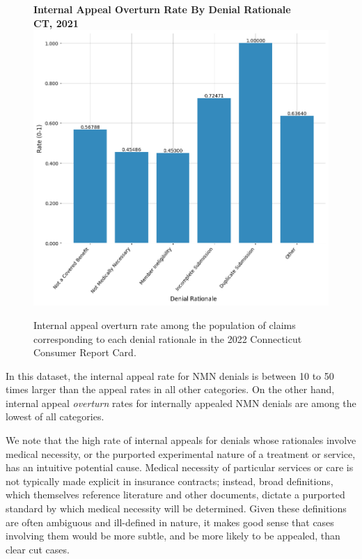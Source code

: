 \documentclass[12pt, a4paper,twoside,parskip=full]{report}
\theoremstyle{plain} %
\theoremstyle{definition} %
\theoremstyle{remark} %
\numberwithin{equation}{chapter}
\begin{document}
			\begin{figure}[h!]
				\centering
				\textbf{Internal Appeal Overturn Rate By Denial Rationale}\\
				\textbf{CT, 2021}\\
				\includegraphics[width=\columnwidth]{images/ct_claims/internal_appeal_overturns_by_rationale.png}
				\caption{Internal appeal overturn rate among the population of claims corresponding to each denial rationale in the 2022 Connecticut Consumer Report Card.}
				\label{ctinternalappealoverturnratebydenialrationale}
			\end{figure}
		
		In this dataset, the internal appeal rate for NMN denials is between 10 to 50 times larger than the appeal rates in all other categories. On the other hand, internal appeal \emph{overturn} rates for internally appealed NMN denials are among the lowest of all categories.
		
		
		We note that the high rate of internal appeals for denials whose rationales involve medical necessity, or the purported experimental nature of a treatment or service, has an intuitive potential cause. Medical necessity of particular services or care is not typically made explicit in insurance contracts; instead, broad definitions, which themselves reference literature and other documents, dictate a purported standard by which medical necessity will be determined. Given these definitions are often ambiguous and ill-defined in nature, it makes good sense that cases involving them would be more subtle, and be more likely to be appealed, than clear cut cases.
		
\end{document}
